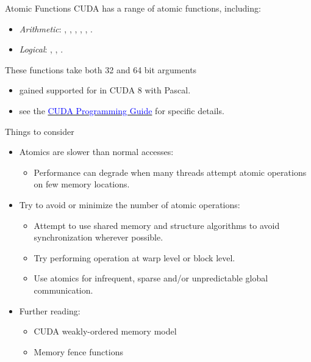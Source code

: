 \documentclass[aspectratio=43]{beamer}
\begin{document}
\begin{frame}[fragile]{Atomic Functions}
    CUDA has a range of atomic functions, including:
    \begin{itemize}
        \item \emph{Arithmetic}:
            , , , , , .
        \item \emph{Logical}: 
            , , .
    \end{itemize}
    These functions take both 32 and 64 bit arguments
    \begin{itemize}
        \item {} gained supported for  in CUDA 8 with Pascal.
        \item see the \href{https://docs.nvidia.com/cuda/cuda-c-programming-guide/index.html#atomic-functions}{\textcolor{blue}{CUDA Programming Guide}} for specific details.
    \end{itemize}
\end{frame}

\begin{frame}[fragile]{Things to consider}
    \begin{itemize}
        \item Atomics are slower than normal accesses:
        \begin{itemize}
            \item Performance can degrade when many threads attempt atomic operations on few memory locations.
        \end{itemize}
        \medskip
        \item Try to avoid or minimize the number of atomic operations:
        \begin{itemize}
            \item Attempt to use shared memory and structure algorithms to avoid synchronization wherever possible.
            \item Try performing operation at warp level or block level.
            \item Use atomics for infrequent, sparse and/or unpredictable global communication.
        \end{itemize}
        \medskip
        \item Further reading:
        \begin{itemize}
            \item CUDA weakly-ordered memory model
            \item Memory fence functions
        \end{itemize}
    \end{itemize}
\end{frame}
\end{document}
